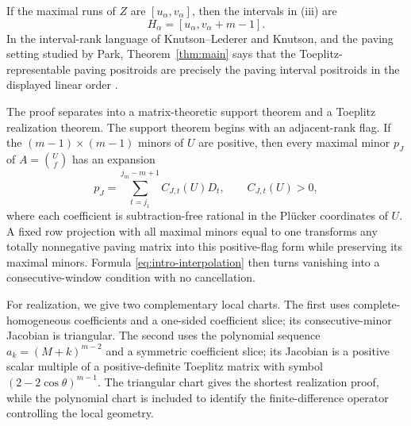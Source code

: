 \documentclass{amsart}
\numberwithin{equation}{section}
\theoremstyle{definition}
\theoremstyle{remark}
\begin{document}
If the maximal runs of $Z$ are $[u_\alpha,v_\alpha]$, then the intervals in (iii) are
\[
 H_\alpha=[u_\alpha,v_\alpha+m-1].
\]
In the interval-rank language of Knutson--Lederer and Knutson, and the paving setting studied by Park, Theorem~\ref{thm:main} says that the Toeplitz-representable paving positroids are precisely the paving interval positroids in the displayed linear order \cite{KnutsonLederer,Knutson,Park}.

The proof separates into a matrix-theoretic support theorem and a Toeplitz realization theorem.  The support theorem begins with an adjacent-rank flag.  If the $(m-1)\times(m-1)$ minors of $U$ are positive, then every maximal minor $p_J$ of $A=\binom{U}{f}$ has an expansion
\begin{equation}\label{eq:intro-interpolation}
 p_J=\sum_{t=j_1}^{j_m-m+1}C_{J,t}(U)D_t,
 \qquad C_{J,t}(U)>0,
\end{equation}
where each coefficient is subtraction-free rational in the Pl\"ucker coordinates of $U$.  A fixed row projection with all maximal minors equal to one transforms any totally nonnegative paving matrix into this positive-flag form while preserving its maximal minors.  Formula \eqref{eq:intro-interpolation} then turns vanishing into a consecutive-window condition with no cancellation.

For realization, we give two complementary local charts.  The first uses complete-homogeneous coefficients and a one-sided coefficient slice; its consecutive-minor Jacobian is triangular.  The second uses the polynomial sequence $a_k=(M+k)^{m-2}$ and a symmetric coefficient slice; its Jacobian is a positive scalar multiple of a positive-definite Toeplitz matrix with symbol $(2-2\cos\theta)^{m-1}$.  The triangular chart gives the shortest realization proof, while the polynomial chart is included to identify the finite-difference operator controlling the local geometry.
\end{document}
